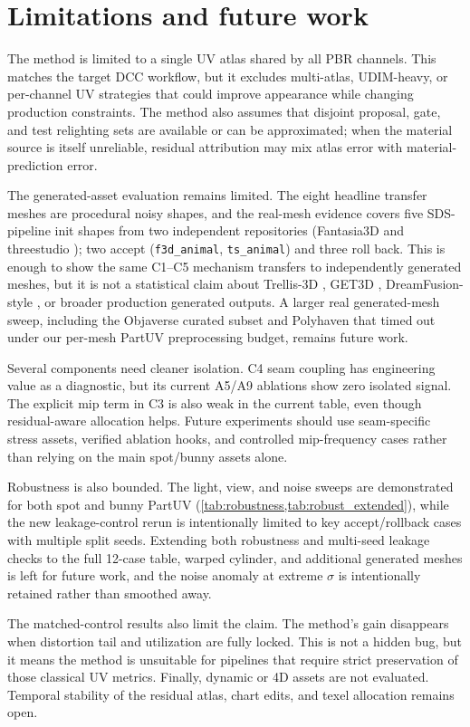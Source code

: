 \section{Limitations and future work}
\label{sec:limitations}

The method is limited to a single UV atlas shared by all PBR channels. This matches the target DCC workflow, but it excludes multi-atlas, UDIM-heavy, or per-channel UV strategies that could improve appearance while changing production constraints. The method also assumes that disjoint proposal, gate, and test relighting sets are available or can be approximated; when the material source is itself unreliable, residual attribution may mix atlas error with material-prediction error.

The generated-asset evaluation remains limited. The eight headline transfer meshes are procedural noisy shapes, and the real-mesh evidence covers five SDS-pipeline init shapes from two independent repositories (Fantasia3D \cite{chen2023fantasia3d} and threestudio \cite{guo2023threestudio}); two accept (\texttt{f3d\_animal}, \texttt{ts\_animal}) and three roll back. This is enough to show the same C1--C5 mechanism transfers to independently generated meshes, but it is not a statistical claim about Trellis-3D \cite{xiang2024_trellis_structured_3d_latents}, GET3D \cite{gao2022_get3d_generative_model}, DreamFusion-style \cite{poole2023_dreamfusion_text_to_3d}, or broader production generated outputs. A larger real generated-mesh sweep, including the Objaverse curated subset and Polyhaven that timed out under our per-mesh PartUV preprocessing budget, remains future work.

Several components need cleaner isolation. C4 seam coupling has engineering value as a diagnostic, but its current A5/A9 ablations show zero isolated signal. The explicit mip term in C3 is also weak in the current table, even though residual-aware allocation helps. Future experiments should use seam-specific stress assets, verified ablation hooks, and controlled mip-frequency cases rather than relying on the main spot/bunny assets alone.

Robustness is also bounded. The light, view, and noise sweeps are demonstrated for both spot and bunny PartUV (\cref{tab:robustness,tab:robust_extended}), while the new leakage-control rerun is intentionally limited to key accept/rollback cases with multiple split seeds. Extending both robustness and multi-seed leakage checks to the full 12-case table, warped cylinder, and additional generated meshes is left for future work, and the noise anomaly at extreme $\sigma$ is intentionally retained rather than smoothed away.

The matched-control results also limit the claim. The method's gain disappears when distortion tail and utilization are fully locked. This is not a hidden bug, but it means the method is unsuitable for pipelines that require strict preservation of those classical UV metrics. Finally, dynamic or 4D assets are not evaluated. Temporal stability of the residual atlas, chart edits, and texel allocation remains open.
